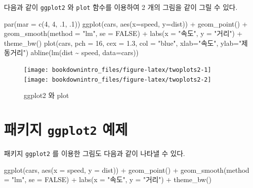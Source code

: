 \documentclass[
]{book}
\newenvironment{Shaded}{\begin{snugshade}}{\end{snugshade}}
\newcommand{\AttributeTok}[1]{\textcolor[rgb]{0.77,0.63,0.00}{#1}}
\newcommand{\ConstantTok}[1]{\textcolor[rgb]{0.00,0.00,0.00}{#1}}
\newcommand{\DecValTok}[1]{\textcolor[rgb]{0.00,0.00,0.81}{#1}}
\newcommand{\FloatTok}[1]{\textcolor[rgb]{0.00,0.00,0.81}{#1}}
\newcommand{\FunctionTok}[1]{\textcolor[rgb]{0.00,0.00,0.00}{#1}}
\newcommand{\NormalTok}[1]{#1}
\newcommand{\SpecialCharTok}[1]{\textcolor[rgb]{0.00,0.00,0.00}{#1}}
\newcommand{\StringTok}[1]{\textcolor[rgb]{0.31,0.60,0.02}{#1}}
\theoremstyle{definition}
\theoremstyle{definition}
\theoremstyle{definition}
\theoremstyle{definition}
\theoremstyle{remark}
\begin{document}
다음과 같이 \texttt{ggplot2} 와 \texttt{plot} 함수를 이용하여 2 개의 그림을 같이 그릴 수 있다.

\begin{Shaded}
\begin{Highlighting}[]
\FunctionTok{par}\NormalTok{(}\AttributeTok{mar =} \FunctionTok{c}\NormalTok{(}\DecValTok{4}\NormalTok{, }\DecValTok{4}\NormalTok{, .}\DecValTok{1}\NormalTok{, .}\DecValTok{1}\NormalTok{))}
\FunctionTok{ggplot}\NormalTok{(cars,  }\FunctionTok{aes}\NormalTok{(}\AttributeTok{x=}\NormalTok{speed, }\AttributeTok{y=}\NormalTok{dist)) }\SpecialCharTok{+} \FunctionTok{geom\_point}\NormalTok{() }\SpecialCharTok{+} \FunctionTok{geom\_smooth}\NormalTok{(}\AttributeTok{method =} \StringTok{"lm"}\NormalTok{, }\AttributeTok{se =} \ConstantTok{FALSE}\NormalTok{) }\SpecialCharTok{+} \FunctionTok{labs}\NormalTok{(}\AttributeTok{x =} \StringTok{"속도"}\NormalTok{, }\AttributeTok{y =} \StringTok{"거리"}\NormalTok{)  }\SpecialCharTok{+} \FunctionTok{theme\_bw}\NormalTok{()}
\FunctionTok{plot}\NormalTok{(cars, }\AttributeTok{pch =} \DecValTok{16}\NormalTok{, }\AttributeTok{cex =} \FloatTok{1.3}\NormalTok{, }\AttributeTok{col =} \StringTok{"blue"}\NormalTok{, }\AttributeTok{xlab=}\StringTok{"속도"}\NormalTok{, }\AttributeTok{ylab=}\StringTok{"제동거리"}\NormalTok{)}
\FunctionTok{abline}\NormalTok{(}\FunctionTok{lm}\NormalTok{(dist }\SpecialCharTok{\textasciitilde{}}\NormalTok{ speed, }\AttributeTok{data=}\NormalTok{cars))}
\end{Highlighting}
\end{Shaded}

\begin{figure}
\texttt{[image: bookdownintro\_files/figure-latex/twoplots2-1]} \texttt{[image: bookdownintro\_files/figure-latex/twoplots2-2]} \caption{ggplot2 와 plot}\label{fig:twoplots2}
\end{figure}

\hypertarget{uxd328uxd0a4uxc9c0-ggplot2-uxc608uxc81c}{%
\section{\texorpdfstring{패키지 \texttt{ggplot2} 예제}{패키지 ggplot2 예제}}\label{uxd328uxd0a4uxc9c0-ggplot2-uxc608uxc81c}}

패키지 \texttt{ggplot2} 를 이용한 그림도 다음과 같이 나타낼 수 있다.

\begin{Shaded}
\begin{Highlighting}[]
\FunctionTok{ggplot}\NormalTok{(cars, }\FunctionTok{aes}\NormalTok{(}\AttributeTok{x =}\NormalTok{ speed, }\AttributeTok{y =}\NormalTok{ dist)) }\SpecialCharTok{+} \FunctionTok{geom\_point}\NormalTok{() }\SpecialCharTok{+} \FunctionTok{geom\_smooth}\NormalTok{(}\AttributeTok{method =} \StringTok{"lm"}\NormalTok{, }
    \AttributeTok{se =} \ConstantTok{FALSE}\NormalTok{) }\SpecialCharTok{+} \FunctionTok{labs}\NormalTok{(}\AttributeTok{x =} \StringTok{"속도"}\NormalTok{, }\AttributeTok{y =} \StringTok{"거리"}\NormalTok{) }\SpecialCharTok{+} \FunctionTok{theme\_bw}\NormalTok{()}
\end{Highlighting}
\end{Shaded}
\end{document}
